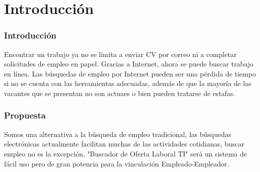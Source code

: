 \section{Introducción}
\frame
{
  \frametitle{Introducción}
 Encontrar un trabajo ya no se limita a enviar CV por correo ni a completar solicitudes de empleo en papel. Gracias a Internet, ahora se puede buscar trabajo en línea. \newline
 Las búsquedas de empleo por Internet pueden ser una pérdida de tiempo si no se cuenta con las herramientas adecuadas, además de que la mayoría de las vacantes que se presentan no son actuaes o bien pueden tratarse de estafas.
 	 
}
\frame
{
\frametitle{Propuesta}
Somos una alternativa a la búsqueda de empleo tradicional, las búsquedas electrónicas actualmente facilitan muchas de  las actividades cotidianas, buscar empleo no es la excepción,  "Buscador de Oferta Laboral TI"  será un sistema de  fácil uso pero de gran potencia para la vinculación Empleado-Empleador. 
}



